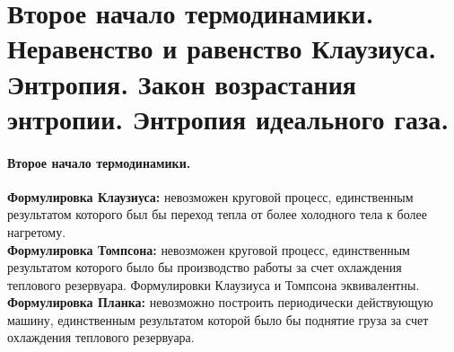 \section{\normalsize  Второе начало термодинамики. Неравенство и равенство Клаузиуса. Энтропия. Закон возрастания энтропии. Энтропия идеального газа.}
\paragraph{Второе начало термодинамики.} \textbf{Формулировка Клаузиуса:} невозможен круговой процесс, единственным результатом которого был бы переход тепла от более холодного тела к более нагретому.\\
\textbf{Формулировка Томпсона:} невозможен круговой процесс, единственным результатом которого было бы производство работы за счет охлаждения теплового резервуара. Формулировки Клаузиуса и Томпсона эквивалентны. \\
\textbf{Формулировка Планка:} невозможно построить периодически действующую машину, единственным результатом которой было бы поднятие груза за счет охлаждения теплового резервуара.
